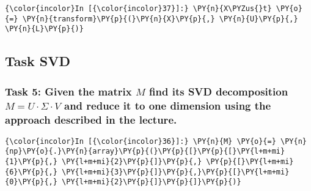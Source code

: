     \begin{Verbatim}[commandchars=\\\{\}]
{\color{incolor}In [{\color{incolor}37}]:} \PY{n}{X\PYZus{}t} \PY{o}{=} \PY{n}{transform}\PY{p}{(}\PY{n}{X}\PY{p}{,} \PY{n}{U}\PY{p}{,} \PY{n}{L}\PY{p}{)}
\end{Verbatim}

    \hypertarget{task-svd}{%
\subsection{Task SVD}\label{task-svd}}

    \hypertarget{task-5-given-the-matrix-m-find-its-svd-decomposition-m-u-cdot-sigma-cdot-v-and-reduce-it-to-one-dimension-using-the-approach-described-in-the-lecture.}{%
\subsubsection{\texorpdfstring{Task 5: Given the matrix \(M\) find its
SVD decomposition \(M= U \cdot \Sigma \cdot V\) and reduce it to one
dimension using the approach described in the
lecture.}{Task 5: Given the matrix M find its SVD decomposition M= U \textbackslash{}cdot \textbackslash{}Sigma \textbackslash{}cdot V and reduce it to one dimension using the approach described in the lecture.}}\label{task-5-given-the-matrix-m-find-its-svd-decomposition-m-u-cdot-sigma-cdot-v-and-reduce-it-to-one-dimension-using-the-approach-described-in-the-lecture.}}

    \begin{Verbatim}[commandchars=\\\{\}]
{\color{incolor}In [{\color{incolor}36}]:} \PY{n}{M} \PY{o}{=} \PY{n}{np}\PY{o}{.}\PY{n}{array}\PY{p}{(}\PY{p}{[}\PY{p}{[}\PY{l+m+mi}{1}\PY{p}{,} \PY{l+m+mi}{2}\PY{p}{]}\PY{p}{,} \PY{p}{[}\PY{l+m+mi}{6}\PY{p}{,} \PY{l+m+mi}{3}\PY{p}{]}\PY{p}{,}\PY{p}{[}\PY{l+m+mi}{0}\PY{p}{,} \PY{l+m+mi}{2}\PY{p}{]}\PY{p}{]}\PY{p}{)}
\end{Verbatim}

